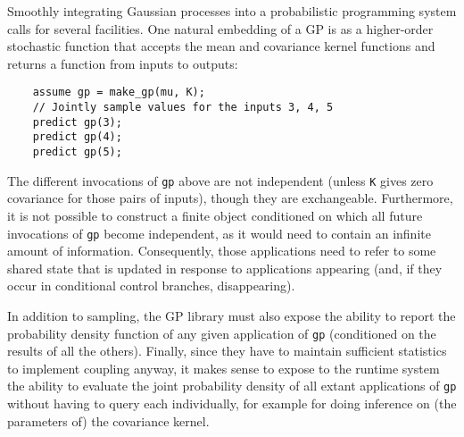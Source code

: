 % 
% 
% 
% 
% 
% 

Smoothly integrating Gaussian processes into a probabilistic
programming system calls for several facilities.  One natural
embedding of a \ac{GP} is as a higher-order stochastic function that
accepts the mean and covariance kernel functions and returns a
function from inputs to outputs:

    \begin{lstlisting}
    assume gp = make_gp(mu, K);
    // Jointly sample values for the inputs 3, 4, 5
    predict gp(3);
    predict gp(4);
    predict gp(5);
    \end{lstlisting}

The different invocations of \texttt{gp} above are not independent
(unless \texttt{K} gives zero covariance for those pairs of inputs),
though they are exchangeable.  Furthermore, it is not possible to
construct a finite object conditioned on which all future invocations
of \texttt{gp} become independent, as it would need to contain an
infinite amount of information.  Consequently, those applications need
to refer to some shared state that is updated in response to
applications appearing (and, if they occur in conditional control
branches, disappearing).

In addition to sampling, the \ac{GP} library must also expose the
ability to report the probability density function of any given
application of \texttt{gp} (conditioned on the results of all the
others).  Finally, since they have to maintain sufficient statistics
to implement coupling anyway, it makes sense to expose to the runtime
system the ability to evaluate the joint probability density of all
extant applications of \texttt{gp} without having to query each
individually, for example for doing inference on (the parameters of)
the covariance kernel.

